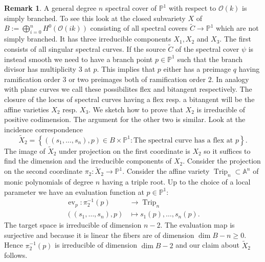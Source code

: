 \documentclass[12pt]{extarticle}
\theoremstyle{definition}
\newtheorem{remark}[theorem]{Remark}
\numberwithin{theorem}{section}
\newcommand{\PP}{\mathbb{P}}
\newcommand{\Aff}{\mathbb{A}}
\newcommand{\OO}{\mathcal{O}}
\newcommand{\op}{\operatorname}
\renewcommand{\tilde}{\widetilde}		%
\begin{document}
\begin{remark}
A general degree $n$ spectral cover of $\PP^1$ with respect to $\OO(k)$ is simply branched. To see this look at the closed subvariety $X$ of $B:=\bigoplus_{i=0}^n H^0(\OO(ik))$ consisting of all spectral covers $\tilde{C} \rightarrow \PP^1$ which are not simply branched. It has three irreducible components $X_1, X_2$ and $X_3$. The first consists of all singular spectral curves.  If the source $\tilde{C}$ of the spectral cover  $\psi$ is instead smooth we need to have a branch point $p \in \PP^1$ such that the branch divisor has multiplicity $3$ at $p$. This implies that $p$ either has a preimage $q$ having ramification order $3$ or two preimages both of ramification order $2$. In analogy with plane curves we call these possibilites flex and bitangent respectively. The closure of the locus of spectral curves having a flex resp. a bitangent will be the affine varieties $X_2$ resp. $X_3$. We sketch how to prove that $X_2$ is irreducible of positive codimension. The argument for the other two is similar. Look at the incidence correspondence 
\begin{equation*}
\tilde{X}_2 = \left\{ ((s_1,\ldots,s_n),p) \in B \times \PP^1 : \text{The spectral curve has a flex at $p$} \right\}.
\end{equation*}
The image of $\tilde{X}_2$ under projection on the first coordinate is $X_2$ so it suffices to find the dimension and the irreducible components of $X_2$. Consider the projection on the second coordinate $\pi_2: \tilde{X}_2 \rightarrow \PP^1$. Consider the affine variety $\op{Trip}_n \subset \Aff^n$ of monic polynomials of degree $n$ having a triple root. Up to the choice of a local parameter we have an evaluation function at $p \in \PP^1$:
\begin{align*}
\op{ev}_p: \pi_2^{-1}(p) &\to \op{Trip}_n
\\
((s_1,\ldots,s_n),p) &\mapsto s_1(p),\ldots,s_n(p).
\end{align*}
The target space is irreducible of dimension $n-2$. The evaluation map is surjective and because it is linear the fibers are of dimension $\dim B - n \geq 0$. Hence $\pi_2^{-1}(p)$ is irreducible of dimension $\dim B -2$ and our claim about $\tilde{X}_2$ follows.
\end{remark}
\end{document}

